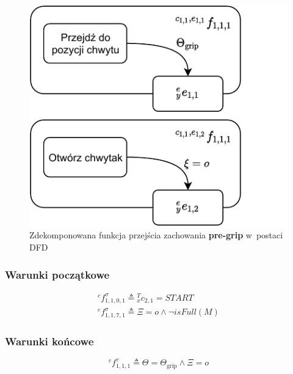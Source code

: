 \begin{figure}[H]
    \centering
    \includegraphics[width=\columnwidth]{figures/ISR-cs-fp-pre-grip.pdf}
    \caption{Zdekomponowana funkcja przejścia zachowania \textbf{pre-grip} w~postaci DFD}
    \label{fig:cs-fp-pre-grip}
\end{figure}

\subsubsection{Warunki początkowe}
\begin{equation}
    \begin{gathered}
        {}^{c}f^{\sigma}_{1,1,0,1} \triangleq {}^{T}_{x}c_{2,1} = START\\
        {}^{c}f^{\sigma}_{1,1,7,1} \triangleq \Xi = o \land \neg isFull(M)
    \end{gathered}
\end{equation}

\subsubsection{Warunki końcowe}
\begin{equation}
    {}^{c}f^{\tau}_{1,1,1} \triangleq \Theta = \Theta_{\mathrm{grip}} \land \Xi = o
\end{equation}


